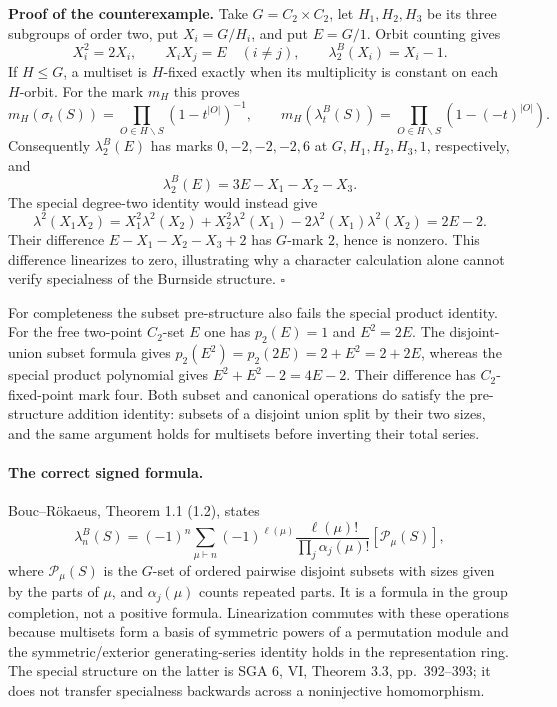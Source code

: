 \textbf{Proof of the counterexample.}
Take $G=C_2\times C_2$, let $H_1,H_2,H_3$ be its three subgroups of order
two, put $X_i=G/H_i$, and put $E=G/1$.  Orbit counting gives
\[
 X_i^2=2X_i,\qquad X_iX_j=E\quad(i\ne j),\qquad
 \lambda_2^B(X_i)=X_i-1.
\]
If $H\leq G$, a multiset is $H$-fixed exactly when its multiplicity is
constant on each $H$-orbit.  For the mark $m_H$ this proves
\[
 m_H(\sigma_t(S))=\prod_{O\in H\backslash S}(1-t^{|O|})^{-1},\qquad
 m_H(\lambda_t^B(S))=\prod_{O\in H\backslash S}(1-(-t)^{|O|}).
\]
Consequently $\lambda_2^B(E)$ has marks $0,-2,-2,-2,6$ at
$G,H_1,H_2,H_3,1$, respectively, and
\[
 \lambda_2^B(E)=3E-X_1-X_2-X_3.
\]
The special degree-two identity would instead give
\[
 \lambda^2(X_1X_2)
 =X_1^2\lambda^2(X_2)+X_2^2\lambda^2(X_1)
       -2\lambda^2(X_1)\lambda^2(X_2)=2E-2.
\]
Their difference $E-X_1-X_2-X_3+2$ has $G$-mark $2$, hence is nonzero.
This difference linearizes to zero, illustrating why a character calculation
alone cannot verify specialness of the Burnside structure. \hfill$\square$

For completeness the subset pre-structure also fails the special
product identity. For the free two-point $C_2$-set $E$ one has
$p_2(E)=1$ and $E^2=2E$. The disjoint-union subset formula gives
$p_2(E^2)=p_2(2E)=2+E^2=2+2E$, whereas the special product
polynomial gives $E^2+E^2-2=4E-2$. Their difference has
$C_2$-fixed-point mark four. Both subset and canonical operations
do satisfy the pre-structure addition identity: subsets of a
disjoint union split by their two sizes, and the same argument
holds for multisets before inverting their total series.

\paragraph{The correct signed formula.}
Bouc--R\"okaeus, Theorem 1.1 (1.2), states
\[
 \lambda_n^B(S)=(-1)^n\sum_{\mu\vdash n}(-1)^{\ell(\mu)}
 \frac{\ell(\mu)!}{\prod_j\alpha_j(\mu)!}[\mathcal P_\mu(S)],
\]
where $\mathcal P_\mu(S)$ is the $G$-set of ordered pairwise disjoint subsets
with sizes given by the parts of $\mu$, and $\alpha_j(\mu)$ counts repeated
parts.  It is a formula in the group completion, not a positive formula.
Linearization commutes with these operations because multisets form a basis
of symmetric powers of a permutation module and the symmetric/exterior
generating-series identity holds in the representation ring.  The special
structure on the latter is SGA 6, VI, Theorem 3.3, pp.~392--393; it does not
transfer specialness backwards across a noninjective homomorphism.

